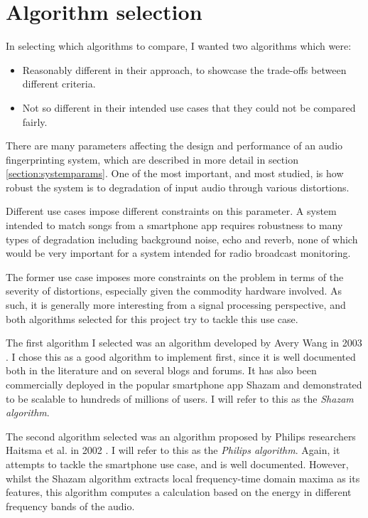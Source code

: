 \documentclass[12pt,a4paper,twoside,openright]{report}
\begin{document}
\section{Algorithm selection}
\label{section:algoselection}

In selecting which algorithms to compare, I wanted two algorithms which were:

\begin{itemize}
  \item Reasonably different in their approach, to showcase the trade-offs between different criteria.
  \item Not so different in their intended use cases that they could not be compared fairly. 
\end{itemize}

There are many parameters affecting the design and performance of an audio fingerprinting system, which are described in more detail in section \ref{section:systemparams}. One of the most important, and most studied, is how robust the system is to degradation of input audio through various distortions. 

Different use cases impose different constraints on this parameter. A system intended to match songs from a smartphone app requires robustness to many types of degradation including background noise, echo and reverb, none of which would be very important for a system intended for radio broadcast monitoring. 

The former use case imposes more constraints on the problem in terms of the severity of distortions, especially given the commodity hardware involved. As such, it is generally more interesting from a signal processing perspective, and both algorithms selected for this project try to tackle this use case.

The first algorithm I selected was an algorithm developed by Avery Wang in 2003 \cite{Wang03}. I chose this as a good algorithm to implement first, since it is well documented both in the literature and on several blogs and forums. It has also been commercially deployed in the popular smartphone app Shazam and demonstrated to be scalable to hundreds of millions of users. I will refer to this as the \textit{Shazam algorithm}.

The second algorithm selected was an algorithm proposed by Philips researchers Haitsma et al. in 2002 \cite{Haitsma02}. I will refer to this as the \textit{Philips algorithm}. Again, it attempts to tackle the smartphone use case, and is well documented. However, whilst the Shazam algorithm extracts local frequency-time domain maxima as its features, this algorithm computes a calculation based on the energy in different frequency bands of the audio. 
\end{document}
